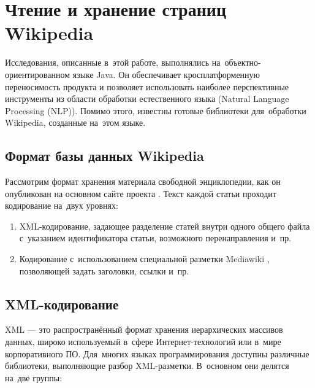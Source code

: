 \section{Чтение и хранение страниц Wikipedia}

Исследования, описанные в~этой работе, выполнялись на~объектно-ориентированном языке Java.
Он обеспечивает кросплатформенную переносимость продукта
и позволяет использовать наиболее перспективные инструменты из области обработки естественного языка (Natural Language Processing (NLP)).
Помимо этого, известны готовые библиотеки для~обработки Wikipedia, созданные на~этом языке.

\subsection{Формат базы данных Wikipedia}

Рассмотрим формат хранения материала свободной энциклопедии, 
как он опубликован на основном сайте проекта \cite{download}. 
Текст каждой статьи проходит кодирование на~двух уровнях:

\begin{enumerate}

\item {
XML-кодирование, задающее разделение статей внутри одного общего
файла с~указанием идентификатора статьи, возможного перенаправления и~пр.
}

\item{
Кодирование с~использованием специальной разметки Mediawiki \cite{wikimarkup},
позволяющей задать заголовки, ссылки и~пр.
}

\end{enumerate}

\subsection{XML-кодирование}

XML --- это распространённый формат хранения иерархических массивов данных, 
широко используемый в~сфере Интернет-технологий или в~мире корпоративного ПО. 
Для~многих языках программирования доступны различные библиотеки, 
выполняющие разбор XML-разметки. 
В~основном они делятся на~две группы: 

